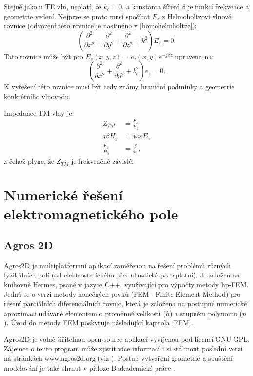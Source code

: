 \documentclass[12pt,a4paper,oneside]{article}
\numberwithin{equation}{section} %
\numberwithin{figure}{section} %
\numberwithin{table}{section} %
\begin{document}
Stejně jako u TE vln, neplatí, že $k_c = 0$, a konstanta šíření $\beta$ je funkcí frekvence a geometrie vedení. Nejprve se proto musí spočítat $E_z$ z Helmoholtzovi vlnové rovnice (odvození této rovnice je nastíněno v \ref{homohelmholtze}):
\begin{equation}
\left( \frac{\partial ^2}{\partial x^2} + \frac{\partial ^2}{\partial y^2} + \frac{\partial ^2}{\partial z^2} + k^2 \right) E_z = 0 .
\end{equation}
Tato rovnice může být pro $E_z(x,y,z) = e_z(x,y)e^{-j \beta z}$ upravena na:
\begin{equation}
\left( \frac{\partial ^2}{\partial x^2} + \frac{\partial ^2}{\partial y^2} + k^2_c \right) e_z = 0 .
\end{equation}
K vyřešení této rovnice musí být tedy známy hraniční podmínky a geometrie konkrétního vlnovodu.

Impedance TM vlny je:
\begin{subequations}
\begin{align}
Z_{TM} &= \frac{E_x}{H_y}
\\
j \beta H_y &= j \omega \varepsilon E_x
\\
\frac{E_x}{H_y} &= \frac{\beta}{\omega \varepsilon} ,
\end{align}
\end{subequations}
z čehož plyne, že $Z_{TM}$ je frekvenčně závislé.


\newpage
\section{Numerické řešení elektromagnetického pole}

\subsection{Agros 2D}
Agros2D je multiplatformní aplikací zaměřenou na řešení problémů různých fyzikálních polí (od elektrostatického přes akustické po teplotní). Je založen na knihovně Hermes, psané v jazyce C++, využívající pro výpočty metody hp-FEM. Jedná se o verzi metody konečných prvků (FEM - Finite Element Method) pro řešení parciálních diferenciálních rovnic, která je založena na postupné numerické aproximaci udávané elementem o proměnné velikosti ($h$) a stupněm polynomu ($p$). Úvod do metody FEM poskytuje následující kapitola \ref{FEM}. \cite{hpFEM}

Agros2D je volně šiřitelnou open-source aplikací vyvíjenou pod licencí GNU GPL. Zájemce o tento program může zjistit více informací i si stáhnout poslední verzi na stránkách www.agros2d.org (viz \cite{Agros}). Postup vytvoření geometrie a spuštění modelování je také shrnut v příloze B akademické práce \cite{Koudela}.
\end{document}
